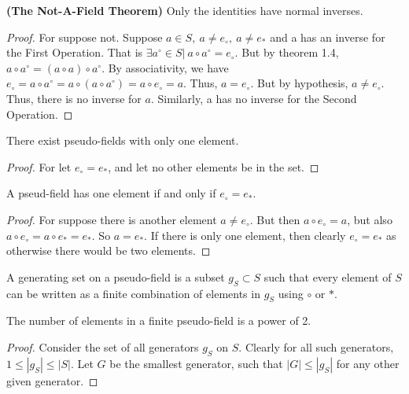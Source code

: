 \documentclass[crop=false,class=book]{standalone}
\begin{document}
\begin{theorem} \textbf{(The Not-A-Field Theorem)} Only the identities have normal inverses.
\end{theorem}
\begin{proof} For suppose not. Suppose $a\in S,\ a\ne e_{\circ},\ a\ne e_{*}$ and a has an inverse for the First Operation. That is $\exists a^{\circ}\in S|\ a\circ a^{\circ}=e_{\circ}$. But by theorem 1.4, $a\circ a^{\circ}=(a\circ a)\circ a^{\circ}$. By associativity, we have $e_{\circ}=a\circ a^{\circ} = a\circ (a\circ a^{\circ})=a\circ e_{\circ}=a$. Thus, $a=e_{\circ}$. But by hypothesis, $a\ne e_{\circ}$. Thus, there is no inverse for $a$. Similarly, a has no inverse for the Second Operation.
\end{proof}
\begin{theorem}
There exist pseudo-fields with only one element.
\end{theorem}
\begin{proof}
For let $e_{\circ} = e_{*}$, and let no other elements be in the set. 
\end{proof}
\begin{theorem}
A pseud-field has one element if and only if $e_{\circ} = e_{*}$.
\end{theorem}
\begin{proof}
For suppose there is another element $a \ne e_{\circ}$. But then $a \circ e_{\circ} = a$, but also $a \circ e_{\circ} = a \circ e_{*} = e_{*}$. So $a = e_{*}$. If there is only one element, then clearly $e_{\circ} = e_{*}$ as otherwise there would be two elements.
\end{proof}
\begin{definition} A generating set on a pseudo-field is a subset $g_S \subset S$ such that every element of $S$ can be written as a finite combination of elements in $g_S$ using $\circ$ or $*$.
\end{definition}
\begin{theorem}
The number of elements in a finite pseudo-field is a power of 2.
\end{theorem}
\begin{proof}
Consider the set of all generators $g_S$ on $S$. Clearly for all such generators, $1\leq |g_S|\leq |S|$. Let $G$ be the smallest generator, such that $|G| \leq |g_S|$ for any other given generator. 
\end{proof}
\end{document}
